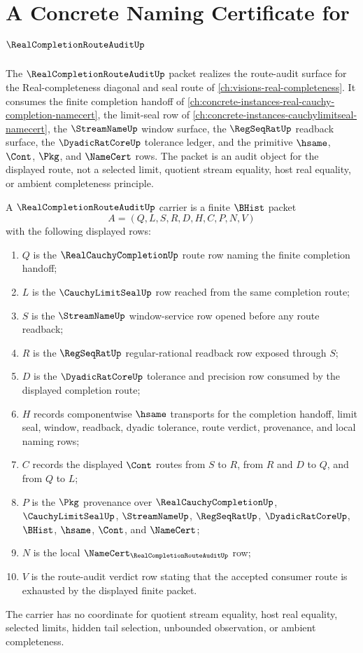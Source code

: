 \chapter{A Concrete Naming Certificate for $\RealCompletionRouteAuditUp$}
\label{ch:concrete-instances-realcompletionrouteaudit-namecert}

The $\RealCompletionRouteAuditUp$ packet realizes the route-audit surface for the Real-completeness diagonal and seal route of \autoref{ch:visions-real-completeness}. It consumes the finite completion handoff of \autoref{ch:concrete-instances-real-cauchy-completion-namecert}, the limit-seal row of \autoref{ch:concrete-instances-cauchylimitseal-namecert}, the $\StreamNameUp$ window surface, the $\RegSeqRatUp$ readback surface, the $\DyadicRatCoreUp$ tolerance ledger, and the primitive $\hsame$, $\Cont$, $\Pkg$, and $\NameCert$ rows. The packet is an audit object for the displayed route, not a selected limit, quotient stream equality, host real equality, or ambient completeness principle.

\begin{definition}
\label{def:realcompletionrouteaudit-carrier}
A $\RealCompletionRouteAuditUp$ carrier is a finite $\BHist$ packet
$$
A=(Q,L,S,R,D,H,C,P,N,V)
$$
with the following displayed rows:
\begin{enumerate}
\item $Q$ is the $\RealCauchyCompletionUp$ route row naming the finite completion handoff;
\item $L$ is the $\CauchyLimitSealUp$ row reached from the same completion route;
\item $S$ is the $\StreamNameUp$ window-service row opened before any route readback;
\item $R$ is the $\RegSeqRatUp$ regular-rational readback row exposed through $S$;
\item $D$ is the $\DyadicRatCoreUp$ tolerance and precision row consumed by the displayed completion route;
\item $H$ records componentwise $\hsame$ transports for the completion handoff, limit seal, window, readback, dyadic tolerance, route verdict, provenance, and local naming rows;
\item $C$ records the displayed $\Cont$ routes from $S$ to $R$, from $R$ and $D$ to $Q$, and from $Q$ to $L$;
\item $P$ is the $\Pkg$ provenance over $\RealCauchyCompletionUp$, $\CauchyLimitSealUp$, $\StreamNameUp$, $\RegSeqRatUp$, $\DyadicRatCoreUp$, $\BHist$, $\hsame$, $\Cont$, and $\NameCert$;
\item $N$ is the local $\NameCert_{\RealCompletionRouteAuditUp}$ row;
\item $V$ is the route-audit verdict row stating that the accepted consumer route is exhausted by the displayed finite packet.
\end{enumerate}
The carrier has no coordinate for quotient stream equality, host real equality, selected limits, hidden tail selection, unbounded observation, or ambient completeness.
\end{definition}

